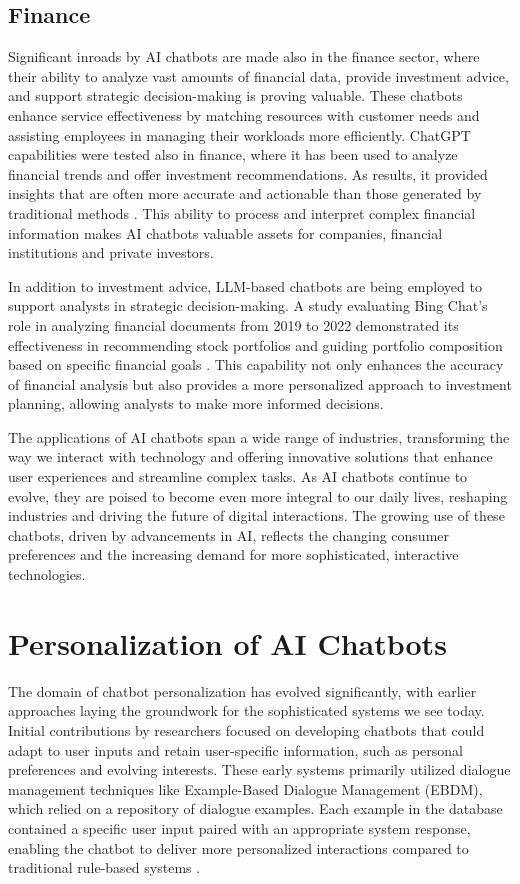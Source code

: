 \subsection{Finance}

Significant inroads by AI chatbots are made also in the finance sector, where their ability to analyze vast amounts of financial data, provide investment advice, and support strategic decision-making is proving valuable. These chatbots enhance service effectiveness by matching resources with customer needs and assisting employees in managing their workloads more efficiently. ChatGPT capabilities were tested also in finance, where it has been used to analyze financial trends and offer investment recommendations. As results, it provided insights that are often more accurate and actionable than those generated by traditional methods \cite{dowling2023chatgpt}. This ability to process and interpret complex financial information makes AI chatbots valuable assets for companies, financial institutions and private investors.

In addition to investment advice, LLM-based chatbots are being employed to support analysts in strategic decision-making. A study evaluating Bing Chat's role in analyzing financial documents from 2019 to 2022 demonstrated its effectiveness in recommending stock portfolios and guiding portfolio composition based on specific financial goals \cite{altan2023science}. This capability not only enhances the accuracy of financial analysis but also provides a more personalized approach to investment planning, allowing analysts to make more informed decisions.

The applications of AI chatbots span a wide range of industries, transforming the way we interact with technology and offering innovative solutions that enhance user experiences and streamline complex tasks. As AI chatbots continue to evolve, they are poised to become even more integral to our daily lives, reshaping industries and driving the future of digital interactions. The growing use of these chatbots, driven by advancements in AI, reflects the changing consumer preferences and the increasing demand for more sophisticated, interactive technologies.

\section{Personalization of AI Chatbots}

The domain of chatbot personalization has evolved significantly, with earlier approaches laying the groundwork for the sophisticated systems we see today. Initial contributions by researchers focused on developing chatbots that could adapt to user inputs and retain user-specific information, such as personal preferences and evolving interests. These early systems primarily utilized dialogue management techniques like Example-Based Dialogue Management (EBDM), which relied on a repository of dialogue examples. Each example in the database contained a specific user input paired with an appropriate system response, enabling the chatbot to deliver more personalized interactions compared to traditional rule-based systems \cite{kim2015acquisition, bang2015example}.

